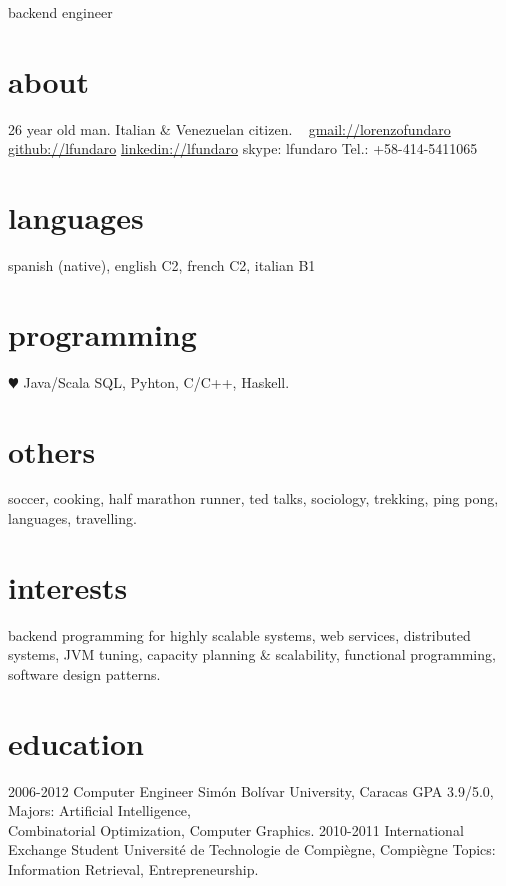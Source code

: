 \documentclass[]{friggeri-cv}
\begin{document}
       {backend engineer}


\begin{aside}
  \section{about}
    26 year old man.
    Italian \& Venezuelan citizen.
    ~
    \href{mailto:lorenzofundaro@gmail.com}{gmail://lorenzofundaro}
    \href{http://github.com/lfundaro}{github://lfundaro}
    \href{http://ve.linkedin.com/in/lfundaro/}{linkedin://lfundaro}
    skype: lfundaro
    Tel.: +58-414-5411065
  \section{languages}
    spanish (native),
   english C2, french C2,
   italian B1
  \section{programming}
    {\color{red} $\varheartsuit$} Java/Scala
    SQL, Pyhton, C/C++, Haskell.
   \section{others}
   soccer, cooking,
   half marathon runner, 
   ted talks, sociology,
   trekking, ping pong,
   languages, travelling.
\end{aside}

\section{interests}

backend programming for highly scalable systems, web services, distributed systems, JVM 
tuning, capacity planning \& scalability, functional programming, software design patterns.

\section{education}

\begin{entrylist}
  \entry
    {\small 2006-2012}
    {Computer Engineer}
    {Simón Bolívar University, Caracas}
    {GPA 3.9/5.0, Majors: Artiﬁcial Intelligence,\\
     Combinatorial Optimization, Computer Graphics.}
  \entry
    {\small 2010-2011}
    {International Exchange Student}
    {Université de Technologie de Compiègne, Compiègne}
    {Topics: Information Retrieval, Entrepreneurship.}
\end{entrylist}
\end{document}
